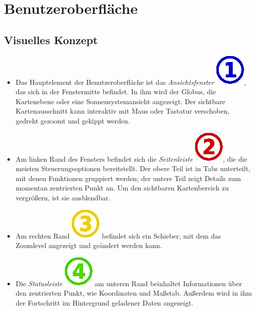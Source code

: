 \documentclass[10pt]{scrreprt}
\begin{document}
\chapter{Benutzeroberfläche}

\section{Visuelles Konzept}

\begin{itemize}
	\item Das Hauptelement der Benutzeroberfläche ist das \textit{Ansichtsfenster} \includegraphics[scale=0.45]{Nummern/1.eps}, das sich in der Fenstermitte befindet. In ihm wird der Globus, die Kartenebene oder eine Sonnensystemansicht angezeigt. Der sichtbare Kartenausschnitt kann interaktiv mit Maus oder Tastatur verschoben, gedreht gezoomt und gekippt werden.
	\item Am linken Rand des Fensters befindet sich die \textit{Seitenleiste} \includegraphics[scale=0.45]{Nummern/2.eps}, die die meisten Steuerungsoptionen bereitstellt. Der obere Teil ist in Tabs unterteilt, mit denen Funktionen gruppiert werden; der untere Teil zeigt Details zum momentan zentrierten Punkt an. Um den sichtbaren Kartenbereich zu vergrößern, ist sie ausblendbar.
	\item Am rechten Rand \includegraphics[scale=0.45]{Nummern/3.eps} befindet sich ein Schieber, mit dem das Zoomlevel angezeigt und geändert werden kann.
	\item Die \textit{Statusleiste} \includegraphics[scale=0.45]{Nummern/4.eps} am unteren Rand beinhaltet Informationen über den zentrierten Punkt, wie Koordinaten und Maßstab. Außerdem wird in ihm der Fortschritt im Hintergrund geladener Daten angezeigt.
\end{itemize}
\end{document}
